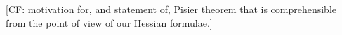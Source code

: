 \documentclass{article}
\newcommand\tr{\operatorname{Tr}}
\newcommand{\CF}[1]{{\color{purple}[CF: #1]}}
\begin{document}
\CF{motivation for, and statement of, Pisier theorem that is comprehensible from the point of view of our Hessian formulae.}






\end{document}
